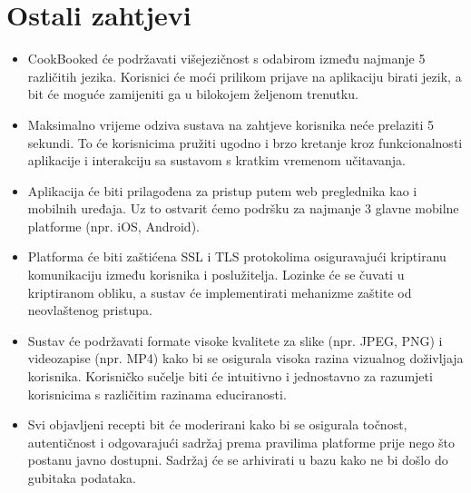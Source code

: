 				\eject
	
		\section{Ostali zahtjevi}
		
		 
			 \begin{itemize}
				\item CookBooked će podržavati višejezičnost s odabirom između najmanje 5 različitih jezika. Korisnici će moći prilikom prijave na aplikaciju birati jezik, a bit će moguće zamijeniti ga u bilokojem željenom trenutku.
				\item Maksimalno vrijeme odziva sustava na zahtjeve korisnika neće prelaziti 5 sekundi. To će korisnicima pružiti ugodno i brzo kretanje kroz funkcionalnosti aplikacije i interakciju sa sustavom s kratkim vremenom učitavanja.
				\item Aplikacija će biti prilagođena za pristup putem web preglednika kao i mobilnih uređaja. Uz to ostvarit ćemo podršku za najmanje 3 glavne mobilne platforme (npr. iOS, Android).
				\item Platforma će biti zaštićena SSL i TLS protokolima osiguravajući kriptiranu komunikaciju između korisnika i poslužitelja. Lozinke će se čuvati u kriptiranom obliku, a sustav će implementirati mehanizme zaštite od neovlaštenog pristupa.
				\item Sustav će podržavati formate visoke kvalitete za slike (npr. JPEG, PNG) i videozapise (npr. MP4) kako bi se osigurala visoka razina vizualnog doživljaja korisnika. Korisničko sučelje biti će intuitivno i jednostavno za razumjeti korisnicima s različitim razinama educiranosti.
				\item Svi objavljeni recepti bit će moderirani kako bi se osigurala točnost, autentičnost i odgovarajući sadržaj prema pravilima platforme prije nego što postanu javno dostupni. Sadržaj će se arhivirati u bazu kako ne bi došlo do gubitaka podataka.
			\end{itemize}
			 
			 
	